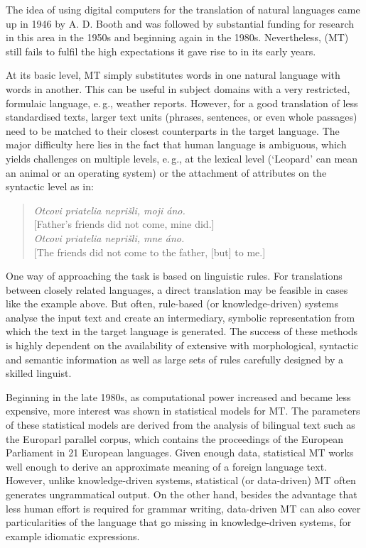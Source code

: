\begin{multicols}{2}
The idea of using digital computers for the translation of natural languages came up in 1946 by A. D. Booth and was followed by substantial funding for research in this area in the 1950s and beginning again in the 1980s. Nevertheless,  (MT) still fails to fulfil the high expectations it gave rise to in its early years. 

At its basic level, MT simply substitutes words in one natural language with words in another. This can be useful in subject domains with a very restricted, formulaic language, e.\,g., weather reports. However, for a good translation of less standardised texts, larger text units (phrases, sentences, or even whole passages) need to be matched to their closest counterparts in the target language. The major difficulty here lies in the fact that human language is ambiguous, which yields challenges on multiple levels, e.\,g.,  at the lexical level (‘Leopard’ can mean an animal or an operating system) or the attachment of attributes on the syntactic level as in:

\begin{verse}
\emph{Otcovi priatelia neprišli, moji áno.}\\
{[}Father's friends did not come, mine did.{]}\\
\smallskip
\emph{Otcovi priatelia neprišli, mne áno.}\\
{[}The friends did not come to the father, {[}but{]} to me.{]}
\end{verse}

One way of approaching the task is based on linguistic rules. For translations between closely related languages, a direct translation may be feasible in cases like the example above. But often, rule-based (or knowledge-driven) systems analyse the input text and create an intermediary, symbolic representation from which the text in the target language is generated. The success of these methods is highly dependent on the availability of extensive  with morphological, syntactic and semantic information as well as large sets of  rules carefully designed by a skilled linguist.

Beginning in the late 1980s, as computational power increased and became less expensive, more interest was shown in statistical models for MT. The parameters of these statistical models are derived from the analysis of bilingual text  such as the Europarl parallel corpus, which contains the proceedings of the European Parliament in 21 European languages. Given enough data, statistical MT works well enough to derive an approximate meaning of a foreign language text. However, unlike knowledge-driven systems, statistical (or data-driven) MT often generates ungrammatical output. On the other hand, besides the advantage that less human effort is required for grammar writing, data-driven MT can also cover particularities of the language that go missing in knowledge-driven systems, for example idiomatic expressions. 


\end{multicols}
